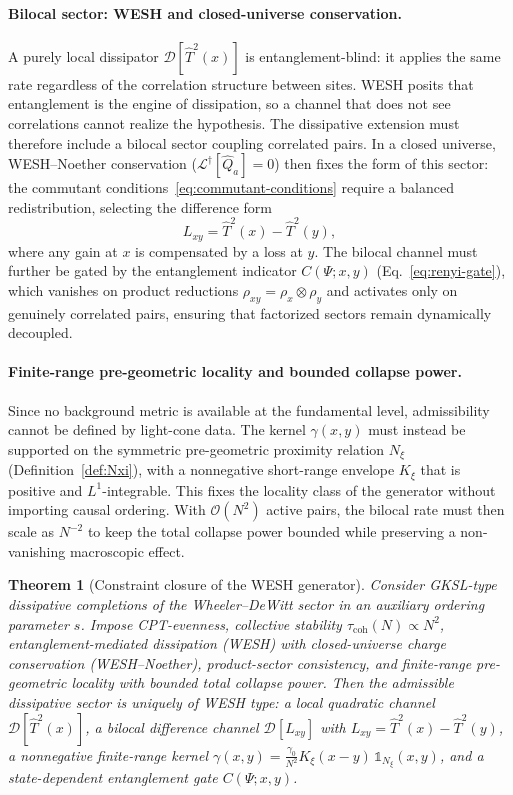\documentclass[12pt,a4paper]{article}
\newtheorem{theorem}{Theorem}[section]
\numberwithin{equation}{section}
\begin{document}
\paragraph{Bilocal sector: WESH and closed-universe conservation.}
A purely local dissipator $\mathcal{D}[\hat T^2(x)]$ is entanglement-blind: it applies the same rate regardless of the correlation structure between sites. WESH posits that entanglement is the engine of dissipation, so a channel that does not see correlations cannot realize the hypothesis. The dissipative extension must therefore include a bilocal sector coupling correlated pairs. In a closed universe, WESH--Noether conservation ($\mathcal{L}^\dagger[\hat Q_a] = 0$) then fixes the form of this sector: the commutant conditions~\eqref{eq:commutant-conditions} require a balanced redistribution, selecting the difference form
\begin{equation}
L_{xy} = \hat T^2(x) - \hat T^2(y),
\label{eq:Lxy-def}
\end{equation}
where any gain at $x$ is compensated by a loss at $y$. The bilocal channel must further be gated by the entanglement indicator $C(\Psi;x,y)$ (Eq.~\eqref{eq:renyi-gate}), which vanishes on product reductions $\rho_{xy} = \rho_x \otimes \rho_y$ and activates only on genuinely correlated pairs, ensuring that factorized sectors remain dynamically decoupled.

\paragraph{Finite-range pre-geometric locality and bounded collapse power.}
Since no background metric is available at the fundamental level, admissibility cannot be defined by light-cone data. The kernel $\gamma(x,y)$ must instead be supported on the symmetric pre-geometric proximity relation $N_\xi$ (Definition~\ref{def:Nxi}), with a nonneg\-ative short-range envelope $K_\xi$ that is positive and $L^1$-integrable. This fixes the locality class of the generator without importing causal ordering. With $\mathcal{O}(N^2)$ active pairs, the bilocal rate must then scale as $N^{-2}$ to keep the total collapse power bounded while preserving a non-vanishing macroscopic effect.

\begin{theorem}[Constraint closure of the WESH generator]
\label{thm:constraint-closure}
Consider GKSL-type dissipative completions of the Wheeler--DeWitt sector in an auxiliary ordering parameter $s$. Impose CPT-evenness, collective stability $\tau_{\mathrm{coh}}(N) \propto N^2$, entanglement-mediated dissipation (WESH) with closed-universe charge conservation (WESH--Noether), product-sector consistency, and finite-range pre-geometric locality with bounded total collapse power. Then the admissible dissipative sector is uniquely of WESH type: a local quadratic channel $\mathcal{D}[\hat T^2(x)]$, a bilocal difference channel $\mathcal{D}[L_{xy}]$ with $L_{xy} = \hat T^2(x) - \hat T^2(y)$, a nonnegative finite-range kernel $\gamma(x,y) = \frac{\gamma_0}{N^2} K_\xi(x{-}y)\,\mathbb{1}_{N_\xi}(x,y)$, and a state-dependent entanglement gate $C(\Psi;x,y)$.
\end{theorem}
\end{document}
